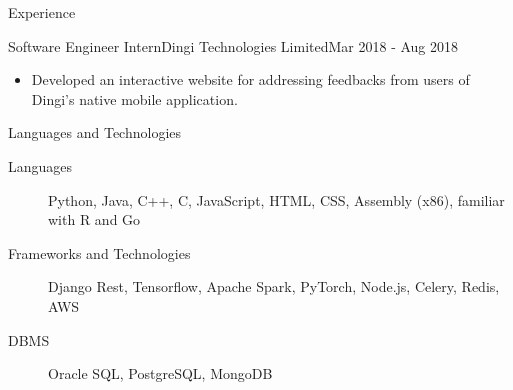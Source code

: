 \documentclass[]{mcdowellcv}
\begin{document}
\begin{cvsection}{Experience}
		\begin{cvsubsection}{Software Engineer Intern}{Dingi Technologies Limited}{Mar 2018 - Aug 2018}
			\begin{itemize}
				\item Developed an interactive website for addressing feedbacks from users of Dingi's native mobile application.
			\end{itemize}
		\end{cvsubsection}
	\end{cvsection}

	\begin{cvsection}{Languages and Technologies}
		\begin{cvsubsection}{}{}{}
			\begin{description}
				\item[Languages] Python, Java, C++, C, JavaScript, HTML, CSS, Assembly (x86), familiar with R and Go
				\item[Frameworks and Technologies] Django Rest, Tensorflow, Apache Spark, PyTorch, Node.js, Celery, Redis, AWS
				\item[DBMS] Oracle SQL, PostgreSQL, MongoDB
			\end{description}
		\end{cvsubsection}
	\end{cvsection}
\end{document}
